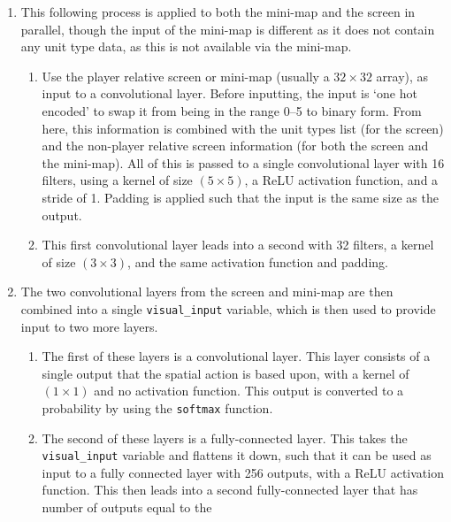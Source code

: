 \begin{enumerate}
    \item This following process is applied to both the mini-map and the screen
        in parallel, though the input of the mini-map is different as it does
        not contain any unit type data, as this is not available via the
        mini-map.
        \begin{enumerate}
            \item Use the player relative screen or mini-map (usually a $32
                \times 32$ array), as input to a convolutional layer. Before
                inputting, the input is `one hot encoded' to swap it from being
                in the range 0--5 to binary form. From here, this information is
                combined with the unit types list (for the screen) and the
                non-player relative screen information (for both the screen and
                the mini-map). All of this is passed to a single convolutional
                layer with 16 filters, using a kernel of size $(5 \times 5)$, a
                ReLU activation function, and a stride of 1. Padding is applied
                such that the input is the same size as the output.
            \item This first convolutional layer leads into a second with 32
                filters, a kernel of size $(3 \times 3)$, and the same
                activation function and padding.
    \end{enumerate}
    \item The two convolutional layers from the screen and mini-map are then
        combined into a single \texttt{visual\_input} variable, which is then
        used to provide input to two more layers.
    \begin{enumerate}
        \item The first of these layers is a convolutional layer. This layer
            consists of a single output that the spatial action is based upon,
            with a kernel of $(1 \times 1)$ and no activation function. This
            output is converted to a probability by using the \texttt{softmax}
            function.
        \item The second of these layers is a fully-connected layer. This takes
            the \texttt{visual\_input} variable and flattens it down, such that
            it can be used as input to a fully connected layer with 256 outputs,
            with a ReLU activation function. This then leads into a second
            fully-connected layer that has number of outputs equal to the

\end{enumerate}
\end{enumerate}
